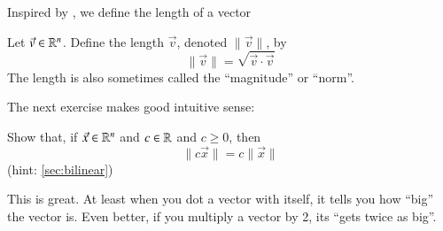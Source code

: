 \documentclass[Main.tex]{subfiles}
\begin{document}
Inspired by \label{sec:selfdotlen}, we define the length of a vector
\begin{Def}
  Let $\vec{v}\in \mathbb{R}^n$.  
  Define the length $\vec{v}$, denoted $\|\vec{v}\|$, by
  \[\|\vec{v}\| = \sqrt{\vec{v}\cdot\vec{v}}\]
  The length is also sometimes called the ``magnitude'' or ``norm''.
\end{Def}
The next exercise makes good intuitive sense:
\begin{EasyEx}
  Show that, if $\vec{x}\in\mathbb{R}^n$ and $c\in \mathbb{R}$ and $c\ge 0$, then 
  \[\|c\vec{x}\| = c\|\vec{x}\|\]
  (hint: \ref{sec:bilinear})
\end{EasyEx}
This is great.  At least when you dot a vector with itself, it tells you how ``big'' the vector is.
Even better, if you multiply a vector by 2, its ``gets twice as big''.
\end{document}
